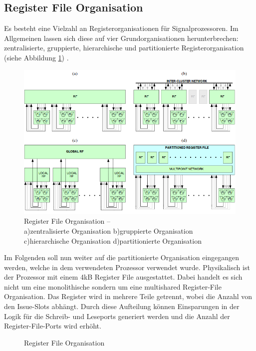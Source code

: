 \subsection{Register File Organisation}
\label{chap:register_orga}
Es besteht eine Vielzahl an Registerorganisationen für Signalprozessoren. Im Allgemeinen lassen sich diese auf vier Grundorganisationen herunterbrechen: zentralisierte, gruppierte, hierarchische und partitionierte Registerorganisation (siehe Abbildung \ref{fig:RegisterOrga}) \cite{paya2010multi}.\newline
\begin{figure}[htbp] 
	\centering
	\includegraphics[width=\textwidth]{fig/Register_orga.png}
	\caption[Register File Organisationstypen]{Register File Organisation –\\ a)zentralisierte Organisation b)gruppierte Organisation c)hierarchische Organisation d)partitionierte Organisation  \cite{paya2010multi}}
	\label{fig:RegisterOrga}
\end{figure}
\newline
Im Folgenden soll nun weiter auf die partitionierte Organisation eingegangen werden, welche in dem verwendeten Prozessor verwendet wurde. Physikalisch ist der Prozessor mit einem 4kB Register File ausgestattet. Dabei handelt es sich nicht um eine monolithische sondern um eine multishared Register-File Organisation. Das Register wird in mehrere Teile getrennt, wobei die Anzahl von den Issue-Slots abhängt. Durch diese Aufteilung können Einsparungen in der Logik für die Schreib- und Leseports generiert werden und die Anzahl der Register-File-Ports wird erhöht.\cite{paya2010multi}
\begin{scriptsize}
	\begin{figure}[htbp] 
		\centering
		
		\caption{Register File Organisation}
		\label{fig:reg_orga}
	\end{figure}
\end{scriptsize}

